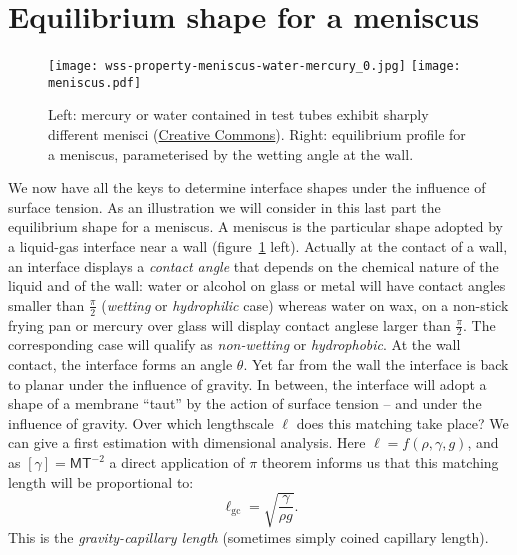\section{Equilibrium shape for a meniscus}
\begin{figure}[htbp]
\begin{center}
\texttt{[image: wss-property-meniscus-water-mercury\_0.jpg]}
\texttt{[image: meniscus.pdf]} 
\end{center}
\caption{Left: mercury or water contained in test tubes exhibit sharply different menisci (\href{https://www.usgs.gov/media/images/water-has-upward-meniscus-mercury-has-a-downward-meniscus}{Creative Commons}). Right: equilibrium profile for a meniscus, parameterised by the wetting angle at the wall.}
\label{fig:meniscus}
\end{figure}
We now have all the keys to determine interface shapes under the influence of surface tension. As an illustration we will consider in this last part the equilibrium shape for a meniscus. A meniscus is the particular shape adopted by a liquid-gas interface near a wall (figure~\ref{fig:meniscus} left). Actually at the contact of a wall, an interface displays a \textit{contact angle} that depends on the chemical nature of the liquid and of the wall: water or alcohol on glass or metal will have contact angles smaller than $\frac{\pi}{2}$ (\textit{wetting} or \textit{hydrophilic} case) whereas water on wax, on a non-stick frying pan or mercury over glass will display contact anglese larger than $\frac{\pi}{2}$. The corresponding case will qualify as \textit{non-wetting} or \textit{hydrophobic}.
 At the wall contact, the interface forms an angle $\theta$. Yet far from the wall the interface is back to planar under the influence of gravity. In between, the interface will adopt a shape of a membrane ``taut'' by the action of surface tension -- and under the influence of gravity. Over which lengthscale $\ell$ does this matching take place? We can give a first estimation with dimensional analysis. Here $\ell = f(\rho, \gamma, g)$, and as $[\gamma] = \mathsf{M}\mathsf{T}^{-2}$ a direct application of $\pi$ theorem informs us that this matching length will be proportional to:
\begin{equation}
\ell_\text{gc} = \sqrt{\frac{\gamma}{\rho g}}.
\end{equation}
This is the \textit{gravity-capillary length} (sometimes simply coined capillary length).

